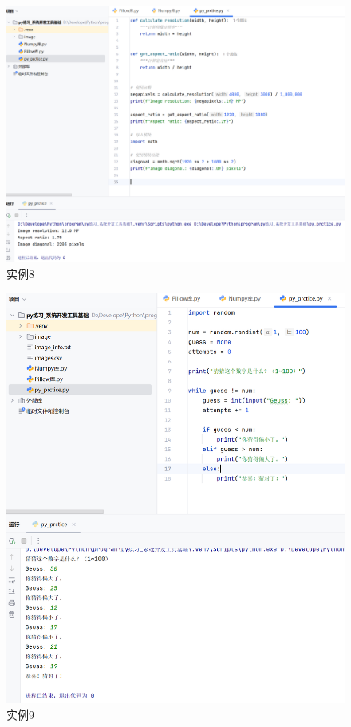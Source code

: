 \documentclass[cn,12pt]{report}
\begin{document}
{    \begin{figure}[htbp]
    \centering
    \includegraphics[width=1\textwidth]{image/7.png}
    \caption{实例8}
  \end{figure}
\FloatBarrier
   
      \begin{figure}[htbp]
    \centering
    \includegraphics[width=1\textwidth]{image/12.png}
    \caption{实例9}
  \end{figure}
\FloatBarrier
   
}
\end{document}
